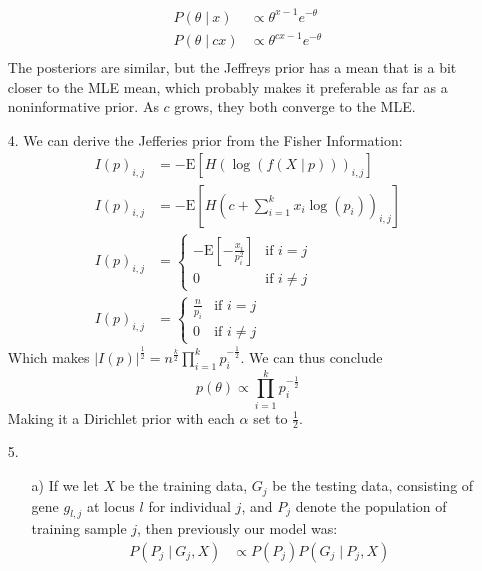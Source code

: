 \documentclass[11pt]{article}
\newcommand{\E}{\mathrm{E}}
\newcommand{\st}{ \; \big | \:}
\theoremstyle{definition}
\begin{document}
\begin{itemize}
\begin{align*}
            P(\theta \st x) &\propto \theta^{x-1} e^{-\theta} \\
            P(\theta \st cx) &\propto \theta^{cx-1} e^{-\theta} \\
        \end{align*}
        The posteriors are similar, but the Jeffreys prior has a mean that is a bit closer to the MLE mean, which probably makes it preferable as far as a noninformative prior. As $c$ grows, they both converge to the MLE.
    \item[4.]
        We can derive the Jefferies prior from the Fisher Information:
        \begin{align*}
            I(p)_{i,j} &= -\E\left[H\left(\log(f(X\st p))\right)_{i,j}\right] \\
            I(p)_{i,j} &= -\E\left[H\left(c + \sum_{i=1}^k x_i\log(p_i)\right)_{i,j}\right] \\
            I(p)_{i,j} &= \begin{cases} 
                                    -\E\left[-\frac{x_i}{p_i^2}\right] & \mbox{if } i=j \\ 
                                                                     0 & \mbox{if } i\neq j 
                               \end{cases}  \\
            I(p)_{i,j} &= \begin{cases} 
                               \frac{n}{p_i} & \mbox{if } i=j \\ 
                                       0 & \mbox{if } i\neq j 
                               \end{cases} 
        \end{align*}
        Which makes \(|I(p)|^{\frac{1}{2}} = n^{\frac{k}{2}}\prod_{i=1}^k p_i^{-\frac{1}{2}}\). We can thus conclude
        \[p(\theta) \propto \prod_{i=1}^k p_i^{-\frac{1}{2}} \]
        Making it a Dirichlet prior with each $\alpha$ set to $\frac{1}{2}$.
    \item[5.]
        \begin{itemize}
            \item[a)]
                If we let $X$ be the training data, $G_j$ be the testing data, consisting of gene $g_{l,j}$ at locus $l$ for individual $j$, and $P_j$ denote the population of training sample $j$, then previously our model was:
                \begin{align*}
                    P(P_j \st G_j, X) &\propto P(P_j)P(G_j \st P_j, X) \\

\end{align*}
\end{itemize}
\end{itemize}
\end{document}
